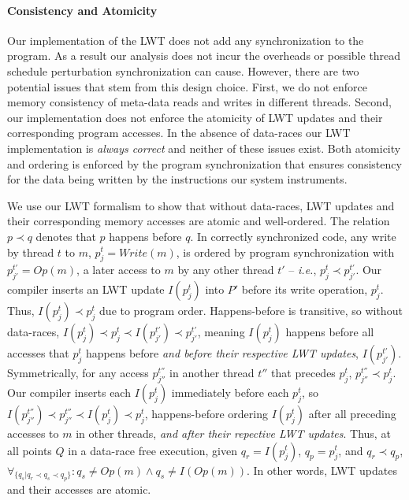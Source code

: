 \documentclass[preprint,9pt]{sigplanconf}
\newcommand{\lwt}{LWT\xspace}
\begin{document}
\paragraph{Consistency and Atomicity}

Our implementation of the \lwt does not add any synchronization to the program.
As a result our analysis does not incur the overheads or possible thread
schedule perturbation synchronization can cause.  However, there are two
potential issues that stem from this design choice. First, we do not enforce
memory consistency of meta-data reads and writes in different threads.  Second,
our implementation does not enforce the atomicity of \lwt updates and their
corresponding program accesses.  In the absence of data-races our \lwt
implementation is {\em always correct} and neither of these issues exist.  Both
atomicity and ordering is enforced by the program synchronization that ensures
consistency for the data being written by the instructions our system
instruments.   

We use our \lwt formalism to show that without data-races, \lwt updates and
their corresponding memory accesses are atomic and well-ordered.  The relation
$p \prec q$ denotes that $p$ happens before $q$.  In correctly synchronized
code, any write by thread $t$ to $m$, $p^{t}_{j} = Write(m)$, is ordered by
program synchronization with $p^{t'}_{j'} = Op(m)$, a later access to $m$ by
any other thread $t'$ -- {\em i.e.}, $p^{t}_{j} \prec p^{t'}_{j'}$.  Our
compiler inserts an \lwt update $I(p^{t}_{j})$ into $P'$ before its write
operation, $p^{t}_{j}$. Thus, $I(p^{t}_{j}) \prec p^{t}_{j}$ due to program
order.  Happens-before is transitive, so without data-races, $I(p^{t}_{j})
\prec p^{t}_{j} \prec I(p^{t'}_{j'}) \prec p^{t'}_{j'}$, meaning $I(p^{t}_{j})$
happens before all accesses that $p^{t}_{j}$ happens before {\em and before
their respective \lwt updates}, $I(p^{t'}_{j'})$.  Symmetrically, for any
access $p^{t''}_{j''}$ in another thread $t''$ that precedes $p^{t}_{j}$,
$p^{t''}_{j''} \prec p^{t}_{j}$.  Our compiler inserts each $I(p^{t}_{j})$
immediately before each $p^{t}_{j}$, so $I(p^{t''}_{j''}) \prec p^{t''}_{j''}
\prec I(p^{t}_{j}) \prec p^{t}_{j}$, happens-before ordering $I(p^{t}_{j})$
after all preceding accesses to $m$ in other threads, {\em and after their
repective \lwt updates}.  Thus, at all points $Q$ in a data-race free
execution, given $q_r = I(p^{t}_{j})$, $q_p = p^{t}_{j}$, and $q_r \prec q_p$,
$\forall_{ \{q_s | q_r \prec q_s \prec q_p \}}: q_s \ne Op(m) \wedge q_s \ne
I(Op(m)) $.  In other words, \lwt updates and their accesses are atomic.
\end{document}
